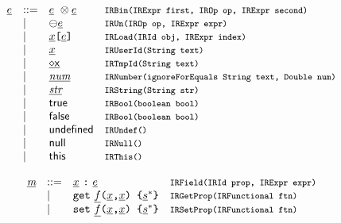 \[\begin{array}{llll}
\ir\expr &::=&
 \irexpr \ \inop \irexpr & \mtt{IRBin(IRExpr first, IROp op, IRExpr second)}\\
 &\mid& \preop \irexpr & \mtt{IRUn(IROp op, IRExpr expr)}\\
 &\mid& \irid\verb+[+\ir\expr\verb+]+ & \mtt{IRLoad(IRId obj, IRExpr index)}\\
 &\mid& \irid& \mtt{IRUserId(String text)}\\
 &\mid& \newvar{x}& \mtt{IRTmpId(String text)}\\
 &\mid& \ir\num & \mtt{IRNumber(ignoreForEquals String text, Double num)}\\
 &\mid& \ir\str & \mtt{IRString(String str)}\\
 &\mid& {\sf true} & \mtt{IRBool(boolean bool)}\\
 &\mid& {\sf false} & \mtt{IRBool(boolean bool)}\\
 &\mid& {\sf undefined} & \mtt{IRUndef()}\\
 &\mid& {\sf null} & \mtt{IRNull()}\\
 &\mid& {\sf this} & \mtt{IRThis()}
\end{array}
\]

\[
\begin{array}{llll}
\ir\member &::=& \irid \ \verb+:+ \ \irexpr & \mtt{IRField(IRId prop, IRExpr expr)}\\
 &\mid& {\tt get}\ \ir{f} \verb+(+\irid\verb+,+\irid\verb+) {+ \ir\stmt^* \verb+}+
 &\mtt{IRGetProp(IRFunctional ftn)}\\
 &\mid& {\tt set}\ \ir{f} \verb+(+\irid\verb+,+\irid\verb+) {+ \ir\stmt^* \verb+}+
 &\mtt{IRSetProp(IRFunctional ftn)}\\

\end{array}
\]

